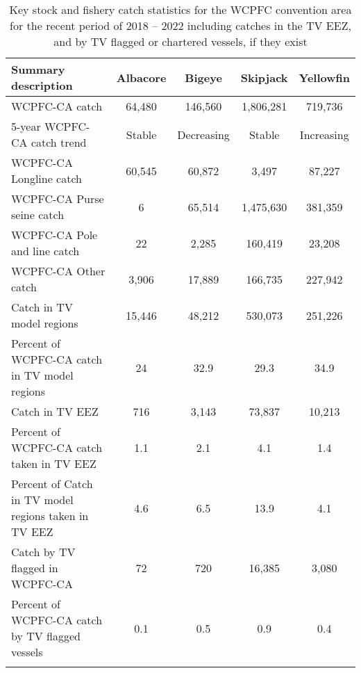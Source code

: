 \begin{longtable}{lcccc}
\caption{Key stock and fishery catch statistics for the WCPFC convention area for the recent period of 2018 -- 2022 including catches in the TV EEZ, and by TV flagged or chartered vessels, if they exist} \\ 
  \hline
Summary description & Albacore & Bigeye & Skipjack & Yellowfin \\ 
  \hline
WCPFC-CA catch & 64,480 & 146,560 & 1,806,281 & 719,736 \\ 
  5-year WCPFC-CA catch trend & Stable & Decreasing & Stable & Increasing \\ 
  WCPFC-CA Longline catch & 60,545 & 60,872 & 3,497 & 87,227 \\ 
  WCPFC-CA Purse seine catch & 6 & 65,514 & 1,475,630 & 381,359 \\ 
  WCPFC-CA Pole and line catch & 22 & 2,285 & 160,419 & 23,208 \\ 
  WCPFC-CA Other catch & 3,906 & 17,889 & 166,735 & 227,942 \\ 
  Catch in TV model regions & 15,446 & 48,212 & 530,073 & 251,226 \\ 
  Percent of WCPFC-CA catch in TV model regions & 24 & 32.9 & 29.3 & 34.9 \\ 
   \hline
Catch in TV EEZ & 716 & 3,143 & 73,837 & 10,213 \\ 
  Percent of WCPFC-CA catch taken in TV EEZ & 1.1 & 2.1 & 4.1 & 1.4 \\ 
  Percent of Catch in TV model regions taken in TV EEZ & 4.6 & 6.5 & 13.9 & 4.1 \\ 
  Catch by TV flagged in WCPFC-CA & 72 & 720 & 16,385 & 3,080 \\ 
  Percent of WCPFC-CA catch by TV flagged vessels & 0.1 & 0.5 & 0.9 & 0.4 \\ 
  \hline
\label{cat_sum_tab}
\end{longtable}
